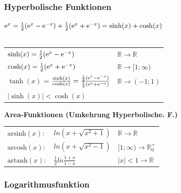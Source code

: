 		\subsubsection{Hyperbolische Funktionen}
			$\mathrm{e}^x = \frac{1}{2} (\mathrm{e}^x - \mathrm{e}^{-x}) + \frac{1}{2} (\mathrm{e}^x + \mathrm{e}^{-x}) = \sinh(x) + \cosh(x)$ \\
			\\
			\begin{tabular}{ll}
				$\sinh(x) = \frac{1}{2} (\mathrm{e}^x - \mathrm{e}^{-x})$ & $\mathbb{R} \rightarrow \mathbb{R}$ \\
				$\cosh(x) = \frac{1}{2} (\mathrm{e}^x + \mathrm{e}^{-x})$ & $\mathbb{R} \rightarrow [1; \infty)$ \\
				$\tanh(x)$ = $\frac{\sinh(x)}{\cosh(x)} = \frac{\frac{1}{2} (\mathrm{e}^x - \mathrm{e}^{-x})}{\frac{1}{2} (\mathrm{e}^x + \mathrm{e}^{-x})}$ & $\mathbb{R} \rightarrow (-1; 1)$ \\	
				$\vert \sinh(x) \vert < \cosh(x)$	& \\
			\end{tabular}
			
			\textbf{Area-Funktionen (Umkehrung Hyperbolische. F.)} \\
				\begin{tabular}{lll}
					$\mathrm{arsinh}(x): $ & $ln(x + \sqrt{x^2+1})$         & $\mathbb{R} \rightarrow \mathbb{R}$ \\
					$\mathrm{arcosh}(x): $ & $ln(x + \sqrt{x^2-1})$         & $[1; \infty) \rightarrow \mathbb{R}^+_0$  \\
					$\mathrm{artanh}(x): $ & $\frac{1}{2}ln\frac{1+x}{1-x}$ & $ \vert x \vert < 1 \rightarrow \mathbb{R} $ \\			
				\end{tabular}
			
		\subsubsection{Logarithmusfunktion}
				
